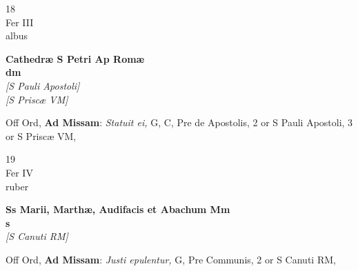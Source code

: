 \documentclass[10pt, openany]{book}
\begin{document}
        \begin{center}
            \begin{minipage}{3.5in}
                \vspace{2em}
                \begin{minipage}{0.5in}
                    {\Huge 18} \\
                    {\normalsize Fer III} \\
                    {\normalsize albus}
                \end{minipage}
                \begin{minipage}{3.0in}
                    \textbf{ \large Cathedræ S Petri Ap Romæ \\
                    \textnormal{\normalsize dm}} \\ \textit{[S Pauli Apostoli]} \\ \textit{[S Priscæ VM]} \\ 
                \end{minipage}
                \begin{justify}Off Ord, \textbf{Ad Missam}: \textit{Statuit ei,} G, C, Pre de Apostolis, 2 or S Pauli Apostoli, 3 or S Priscæ VM,  
                \end{justify}
            \end{minipage}
        \end{center}
    
        \begin{center}
            \begin{minipage}{3.5in}
                \vspace{2em}
                \begin{minipage}{0.5in}
                    {\Huge 19} \\
                    {\normalsize Fer IV} \\
                    {\normalsize ruber}
                \end{minipage}
                \begin{minipage}{3.0in}
                    \textbf{ \large Ss Marii, Marthæ, Audifacis et Abachum Mm \\
                    \textnormal{\normalsize s}} \\ \textit{[S Canuti RM]} \\ 
                \end{minipage}
                \begin{justify}Off Ord, \textbf{Ad Missam}: \textit{Justi epulentur,} G, Pre Communis, 2 or S Canuti RM,  
                \end{justify}
            \end{minipage}
        \end{center}
    
\end{document}
